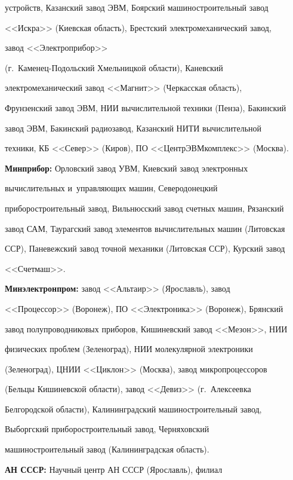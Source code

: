 устройств, Казанский завод ЭВМ, Боярский машиностроительный завод 

<<Искра>> (Киевская об\-ласть), Брестский электромеханический завод, 

завод <<Электроприбор>>  

(г.~Ка\-ме\-нец-По\-доль\-ский Хмельницкой об\-ласти), Каневский 

электромеханический завод <<Магнит>> (Черкасская об\-ласть), 

Фрунзенский завод ЭВМ, НИИ вы\-чис\-ли\-тель\-ной техники (Пенза), Бакинский 

завод ЭВМ, Бакинский радиозавод, Казанский НИТИ вы\-чис\-ли\-тель\-ной 

техники, КБ <<Север>> (Киров), ПО <<Центр\-ЭВМ\-комп\-лекс>> (Москва).

   

   \textbf{Минприбор:} Орловский завод УВМ, Киевский завод электронных 

вычислительных и~управ\-ля\-ющих машин, Северодонецкий 

приборостроительный завод, Вильнюсский завод счетных машин, Рязанский 

завод САМ, Таурагский завод элементов вы\-чис\-ли\-тель\-ных машин (Литовская 

ССР), Паневежский завод точ\-ной механики (Литовская ССР), Курский завод 

<<Счетмаш>>.

   

   \textbf{Минэлектронпром:} завод <<Альтаир>> (Ярославль), завод 

<<Процессор>> (Воронеж), ПО <<Электроника>> (Воронеж), Брянский 

завод полупроводниковых приборов, Кишиневский завод <<Мезон>>, НИИ 

физических проб\-лем (Зеленоград), НИИ молекулярной электроники 

(Зеленоград), ЦНИИ <<Цик\-лон>> (Москва), завод микропроцессоров 

(Бельцы Кишиневской об\-ласти), завод <<Девиз>> (г.~Алексеевка 

Белгородской об\-ласти), Калининградский машиностроительный завод, 

Выборгский приборостроительный завод, Черняховский 

машиностроительный завод (Калининградская об\-ласть).

   

   \textbf{АН СССР:} Научный центр АН СССР (Ярославль), филиал 

